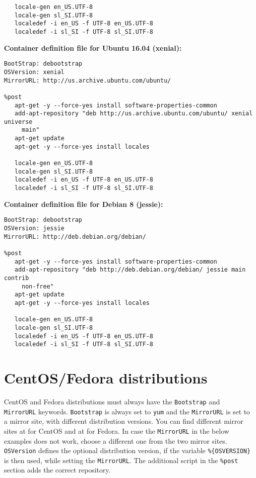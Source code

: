 \documentclass[12pt,a4paper]{report}
\begin{document}
\begin{appendices}
\begin{verbatim}
   locale-gen en_US.UTF-8
   locale-gen sl_SI.UTF-8
   localedef -i en_US -f UTF-8 en_US.UTF-8
   localedef -i sl_SI -f UTF-8 sl_SI.UTF-8
\end{verbatim}
\normalsize
{\noindent}\textbf{Container definition file for Ubuntu 16.04 (xenial):}
\footnotesize
\begin{verbatim}
BootStrap: debootstrap
OSVersion: xenial
MirrorURL: http://us.archive.ubuntu.com/ubuntu/

%post
   apt-get -y --force-yes install software-properties-common
   add-apt-repository "deb http://us.archive.ubuntu.com/ubuntu/ xenial universe
     main"
   apt-get update
   apt-get -y --force-yes install locales
   
   locale-gen en_US.UTF-8
   locale-gen sl_SI.UTF-8
   localedef -i en_US -f UTF-8 en_US.UTF-8
   localedef -i sl_SI -f UTF-8 sl_SI.UTF-8
\end{verbatim}
\normalsize
{\noindent}\textbf{Container definition file for Debian 8 (jessie):}
\footnotesize
\begin{verbatim}
BootStrap: debootstrap
OSVersion: jessie
MirrorURL: http://deb.debian.org/debian/

%post
   apt-get -y --force-yes install software-properties-common
   add-apt-repository "deb http://deb.debian.org/debian/ jessie main contrib
     non-free"
   apt-get update
   apt-get -y --force-yes install locales
   
   locale-gen en_US.UTF-8
   locale-gen sl_SI.UTF-8
   localedef -i en_US -f UTF-8 en_US.UTF-8
   localedef -i sl_SI -f UTF-8 sl_SI.UTF-8
\end{verbatim}
\normalsize

\section{CentOS/Fedora distributions}
CentOS and Fedora distributions must always have the \texttt{Bootstrap} and \linebreak\texttt{MirrorURL} keywords. \texttt{Bootstrap} is always set to \texttt{yum} and the \texttt{MirrorURL} is set to a mirror site, with different distribution versions. You can find different mirror sites at \cite{centosmirror} for CentOS and at \cite{fedoramirror} for Fedora. In case the \texttt{MirrorURL} in the below examples does not work, choose a different one from the two mirror sites. \texttt{OSVersion} defines the optional distribution version, if the variable \texttt{\%\{OSVERSION\}} is then used, while setting the \texttt{MirrorURL}. The additional script in the \texttt{\%post} section adds the correct repository.\\


\end{appendices}
\end{document}

